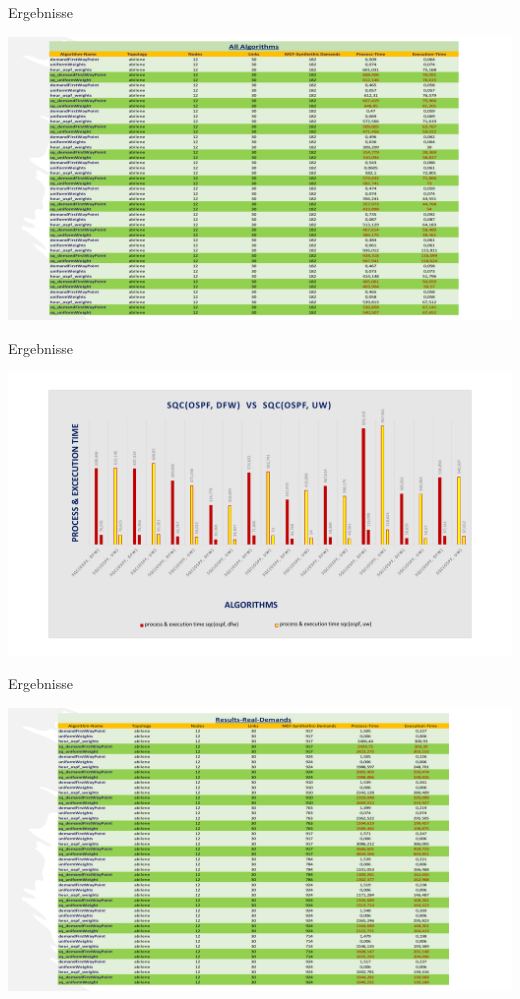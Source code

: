 \documentclass[aspectratio=169,10pt]{beamer}
\begin{document}
\begin{frame}{Ergebnisse}
\begin{center}
    \includegraphics[width=\textwidth]{images/naveed_11.pdf}
\end{center}
\end{frame}
\begin{frame}{Ergebnisse}
\begin{center}
    \includegraphics[width=\textwidth]{images/naveed_12.pdf}
\end{center}
\end{frame}
\begin{frame}{Ergebnisse}
\begin{center}
    \includegraphics[width=\textwidth]{images/naveed_13.pdf}
\end{center}
\end{frame}
\end{document}
